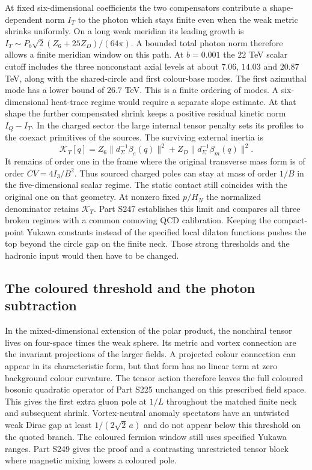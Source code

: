 \documentclass[aps,prd,reprint,onecolumn,nofootinbib,amsmath,amssymb]{revtex4-2}
\begin{document}
At fixed six-dimensional coefficients the two compensators contribute a shape-dependent norm $I_T$ to the photon which stays finite even when the weak metric shrinks uniformly. On a long weak meridian its leading growth is $I_T\sim P_b\sqrt2(Z_6+25Z_D)/(64\pi)$. A bounded total photon norm therefore allows a finite meridian window on this path. At $b=0.001$ the $22$ TeV scalar cutoff includes the three nonconstant axial levels at about $7.06$, $14.03$ and $20.87$ TeV, along with the shared-circle and first colour-base modes. The first azimuthal mode has a lower bound of $26.7$ TeV. This is a finite ordering of modes. A six-dimensional heat-trace regime would require a separate slope estimate. At that shape the further compensated shrink keeps a positive residual kinetic norm $I_Q-I_T$. In the charged sector the large internal tensor penalty sets its profiles to the coexact primitives of the sources. The surviving external inertia is
\begin{equation}
 \mathcal K_T[q]=
 Z_6\|d_\Sigma^{-1}\beta_e(q)\|^2+
 Z_D\|d_\Sigma^{-1}\beta_m(q)\|^2.
\end{equation}
It remains of order one in the frame where the original transverse mass form is of order $CV=4I_3/B^2$. Thus sourced charged poles can stay at mass of order $1/B$ in the five-dimensional scalar regime. The static contact still coincides with the original one on that geometry. At nonzero fixed $p/H_N$ the normalized denominator retains $\mathcal K_T$. Part S247 establishes this limit and compares all three broken regimes with a common comoving QCD calibration. Keeping the compact-point Yukawa constants instead of the specified local dilaton functions pushes the top beyond the circle gap on the finite neck. Those strong thresholds and the hadronic input would then have to be changed.

\subsection{The coloured threshold and the photon subtraction}
In the mixed-dimensional extension of the polar product, the nonchiral tensor lives on four-space times the weak sphere. Its metric and vortex connection are the invariant projections of the larger fields. A projected colour connection can appear in its characteristic form, but that form has no linear term at zero background colour curvature. The tensor action therefore leaves the full coloured bosonic quadratic operator of Part S225 unchanged on this prescribed field space. This gives the first extra gluon pole at $1/L$ throughout the matched finite neck and subsequent shrink. Vortex-neutral anomaly spectators have an untwisted weak Dirac gap at least $1/(2\sqrt2\,a)$ and do not appear below this threshold on the quoted branch. The coloured fermion window still uses specified Yukawa ranges. Part S249 gives the proof and a contrasting unrestricted tensor block where magnetic mixing lowers a coloured pole.
\end{document}
